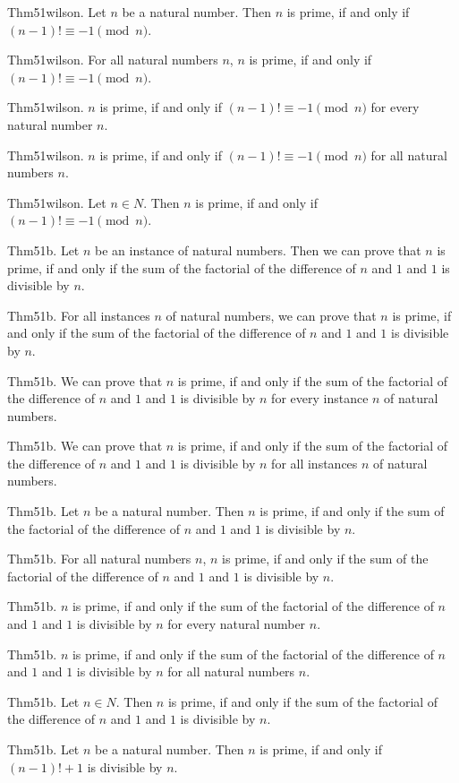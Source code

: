 \documentclass{article}
\begin{document}
Thm51wilson. Let $n$ be a natural number. Then $n$ is prime, if and only if $(n - 1)! \equiv - 1 \pmod{ n}$.

Thm51wilson. For all natural numbers $n$, $n$ is prime, if and only if $(n - 1)! \equiv - 1 \pmod{ n}$.

Thm51wilson. $n$ is prime, if and only if $(n - 1)! \equiv - 1 \pmod{ n}$ for every natural number $n$.

Thm51wilson. $n$ is prime, if and only if $(n - 1)! \equiv - 1 \pmod{ n}$ for all natural numbers $n$.

Thm51wilson. Let $n \in N$. Then $n$ is prime, if and only if $(n - 1)! \equiv - 1 \pmod{ n}$.

Thm51b. Let $n$ be an instance of natural numbers. Then we can prove that $n$ is prime, if and only if the sum of the factorial of the difference of $n$ and $1$ and $1$ is divisible by $n$.

Thm51b. For all instances $n$ of natural numbers, we can prove that $n$ is prime, if and only if the sum of the factorial of the difference of $n$ and $1$ and $1$ is divisible by $n$.

Thm51b. We can prove that $n$ is prime, if and only if the sum of the factorial of the difference of $n$ and $1$ and $1$ is divisible by $n$ for every instance $n$ of natural numbers.

Thm51b. We can prove that $n$ is prime, if and only if the sum of the factorial of the difference of $n$ and $1$ and $1$ is divisible by $n$ for all instances $n$ of natural numbers.

Thm51b. Let $n$ be a natural number. Then $n$ is prime, if and only if the sum of the factorial of the difference of $n$ and $1$ and $1$ is divisible by $n$.

Thm51b. For all natural numbers $n$, $n$ is prime, if and only if the sum of the factorial of the difference of $n$ and $1$ and $1$ is divisible by $n$.

Thm51b. $n$ is prime, if and only if the sum of the factorial of the difference of $n$ and $1$ and $1$ is divisible by $n$ for every natural number $n$.

Thm51b. $n$ is prime, if and only if the sum of the factorial of the difference of $n$ and $1$ and $1$ is divisible by $n$ for all natural numbers $n$.

Thm51b. Let $n \in N$. Then $n$ is prime, if and only if the sum of the factorial of the difference of $n$ and $1$ and $1$ is divisible by $n$.

Thm51b. Let $n$ be a natural number. Then $n$ is prime, if and only if $(n - 1)! + 1$ is divisible by $n$.
\end{document}

